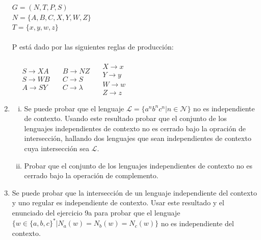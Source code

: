 \documentclass{article}
\begin{document}
\begin{enumerate}[1.]
    $G = (N,T,P,S)$ \\
    $N = \{ A,B,C,X,Y,W,Z \}$ \\
    $T = \{ x,y,w,z \}$ \\ \\
    P está dado por las siguientes reglas de producción: \\ \\
    $\quad \begin{array}{lcl}
      S \rightarrow XA\\
      S \rightarrow WB \\
      A \rightarrow SY
     \end{array} \quad
    \begin{array}{lcl}
      B \rightarrow NZ \\
      C \rightarrow S \\
      C \rightarrow \lambda
    \end{array} \quad
    \begin{array}{lcl}
      X \rightarrow x \\
      Y \rightarrow y \\
      W \rightarrow w \\
      Z \rightarrow z
    \end{array}$
  \item
    \begin{enumerate}[i.]
      \item
        Se puede probar que el lenguaje $\mathcal{L} = \{ a^n b^n c^n | n \in \mathcal{N} \}$ no es independiente
        de contexto. Usando este resultado probar que el conjunto de los lenguajes independientes de contexto no 
        es cerrado bajo la opración de intersección, hallando dos lenguajes que sean independientes de contexto
        cuya intersección sea $\mathcal{L}$.
      \item
        Probar que el conjunto de los lenguajes independientes de contexto no es cerrado bajo la operación de complemento.
    \end{enumerate}
  \item
    Se puede probar que la intersección de un lenguaje independiente del contexto y uno regular es independiente de contexto.
    Usar este resultado y el enunciado del ejercicio 9a para probar que el lenguaje $\{ w\in \{a,b,c \}^* | N_a(w) = 
    N_b(w) = N_c(w) \}$ no es independiente del contexto.
\end{enumerate}
\end{document}
